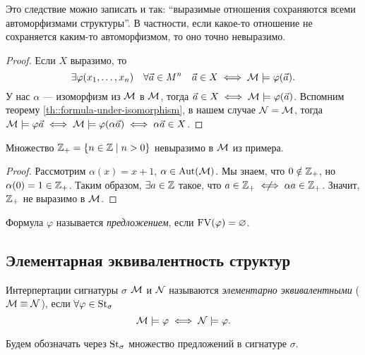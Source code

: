 Это следствие можно записать и так: \enquote{выразимые отношения сохраняются всеми автоморфизмами структуры}.
В частности, если какое-то отношение не сохраняется каким-то автоморфизмом, то оно точно невыразимо.

\begin{proof}
    Если $X$ выразимо, то
    $$
        \exists \varphi(x_{1}, \ldots, x_{n}) \quad \forall \vec{a} \in M^{n} \quad \vec{a} \in X \iff \mathcal{M} \models \varphi(\vec{a}).
    $$
    У нас $\alpha$ --- изоморфизм из $\mathcal{M}$ в $\mathcal{M}$, тогда $\vec{a} \in X \iff \mathcal{M} \models \varphi(\vec{a})$.
    Вспомним теорему \ref{th::formula-under-isomorphism}, в нашем случае $\mathcal{N} = \mathcal{M}$, тогда $\mathcal{M} \models \varphi{\vec{a}} \iff \mathcal{M} \models \varphi(\alpha \vec{a}) \iff \alpha \vec{a} \in X$.
\end{proof}

\begin{statement}
    Множество $\mathbb{Z}_{+} = \{n \in \mathbb{Z} \mid n > 0\}$ невыразимо в $\mathcal{M}$ из примера.
\end{statement}

\begin{proof}
    Рассмотрим $\alpha(x) = x + 1$, $\alpha \in \operatorname{Aut}(\mathcal{M})$.
    Мы знаем, что $0 \notin \mathbb{Z}_{+}$, но $\alpha(0) = 1 \in \mathbb{Z}_{+}$.
    Таким образом, $\exists a \in \mathbb{Z}$ такое, что $a \in \Z_{+} \centernot\iff \alpha a \in \Z_{+}$.
    Значит, $\mathbb{Z}_{+}$ не выразимо в $\mathcal{M}$.
\end{proof}

\begin{definition}
    Формула $\varphi$ называется {\it предложением}, если $\mathrm{FV}(\varphi) = \varnothing$.
\end{definition}

\subsection{Элементарная эквивалентность структур}

\begin{definition}
    Интерпертации сигнатуры $\sigma$ $\mathcal{M}$ и $\mathcal{N}$ называются {\it элементарно эквивалентными} ($\mathcal{M} \equiv \mathcal{N}$), если $\forall \varphi \in \operatorname{St}_{\sigma}$
    $$
        \mathcal{M} \models \varphi \iff \mathcal{N} \models \varphi.
    $$
\end{definition}

\begin{definition}
    Будем обозначать через $\operatorname{St}_{\sigma}$ множество предложений в сигнатуре $\sigma$.
\end{definition}

